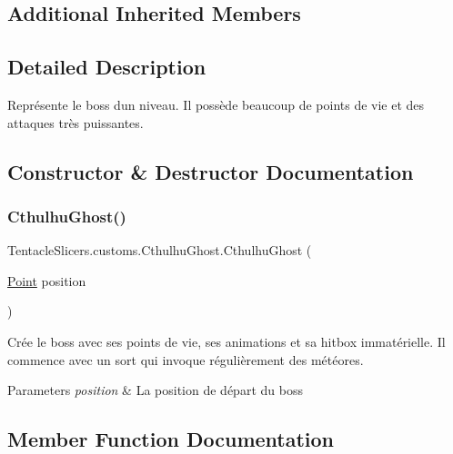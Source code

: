 \subsection*{Additional Inherited Members}


\subsection{Detailed Description}
Représente le boss d\textquotesingle{}un niveau. Il possède beaucoup de points de vie et des attaques très puissantes. 



\subsection{Constructor \& Destructor Documentation}
\mbox{\label{class_tentacle_slicers_1_1customs_1_1_cthulhu_ghost_a36e583df37dcb6535a39af1c29d00eef}} 
\subsubsection{\texorpdfstring{Cthulhu\+Ghost()}{CthulhuGhost()}}
{\footnotesize\ttfamily Tentacle\+Slicers.\+customs.\+Cthulhu\+Ghost.\+Cthulhu\+Ghost (\begin{DoxyParamCaption}\item[{\hyperlink{class_tentacle_slicers_1_1general_1_1_point}{Point}}]{position }\end{DoxyParamCaption})}



Crée le boss avec ses points de vie, ses animations et sa hitbox immatérielle. Il commence avec un sort qui invoque régulièrement des météores. 


\begin{DoxyParams}{Parameters}
{\em position} & La position de départ du boss \\
\hline
\end{DoxyParams}


\subsection{Member Function Documentation}
\mbox{\label{class_tentacle_slicers_1_1customs_1_1_cthulhu_ghost_aeeb398970bf8433917fe035f5ec47f66}} 
